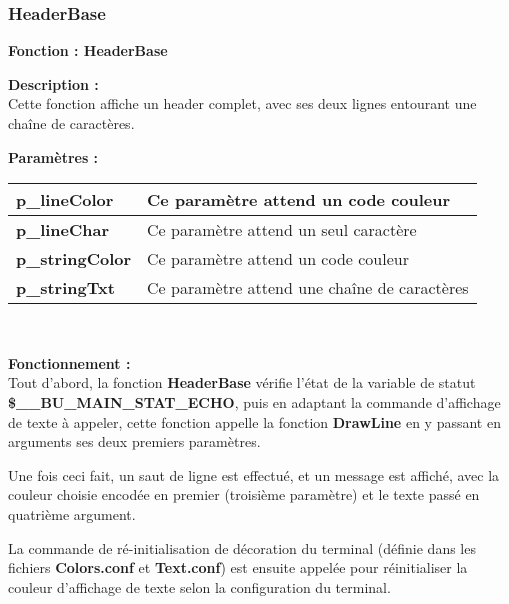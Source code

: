\documentclass[a4paper,10pt]{article}
\begin{document}
\color{blue}
\subsubsection{HeaderBase}\color{white}

\textbf{Fonction : \color{mauve}HeaderBase}\\[1\baselineskip]

\begin{justify}
    \textbf{Description :}\\
    Cette fonction affiche un header complet, avec ses deux lignes entourant une chaîne de caractères.
\end{justify}

\textbf{Paramètres :}\\[1\baselineskip]
\begin{tabular}{|l|l|}
\hline 
\textbf{\color{orange}p\_lineColor} & Ce paramètre attend un code couleur \\ 
\hline 
\textbf{\color{orange}p\_lineChar} & Ce paramètre attend un seul caractère \\ 
\hline 
\textbf{\color{orange}p\_stringColor} & Ce paramètre attend un code couleur \\ 
\hline 
\textbf{\color{orange}p\_stringTxt} & Ce paramètre attend une chaîne de caractères\\ 
\hline 
\end{tabular}\\[1\baselineskip]

\begin{justify}
    \textbf{Fonctionnement :}\\
    Tout d'abord, la fonction \textbf{\color{mauve}HeaderBase} vérifie l'état de la variable de statut \textbf{\color{orange}\$\_\_BU\_MAIN\_STAT\_ECHO}, puis en adaptant la commande d'affichage de texte à appeler, cette fonction appelle la fonction \textbf{\color{mauve}DrawLine} en y passant en arguments ses deux premiers paramètres.
\end{justify}

\begin{justify}
    Une fois ceci fait, un saut de ligne est effectué, et un message est affiché, avec la couleur choisie encodée en premier (troisième paramètre) et le texte passé en quatrième argument.
\end{justify}

\begin{justify}
    La commande de ré-initialisation de décoration du terminal (définie dans les fichiers \textbf{\color{lime}Colors.conf} et \textbf{\color{lime}Text.conf}) est ensuite appelée pour réinitialiser la couleur d'affichage de texte selon la configuration du terminal.
\end{justify}
\end{document}
